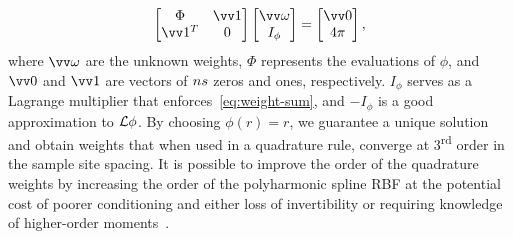 \begin{equation}\label{eq:rbf-quadrature}
    \begin{bmatrix}
            \Phi & \arr{1} \\ \arr{1}^T & 0
    \end{bmatrix}\begin{bmatrix}
            \arr{\omega} \\ I_\phi
    \end{bmatrix} = \begin{bmatrix}
            \arr{0} \\ 4\pi
    \end{bmatrix},
\end{equation}
where $\arr{\omega}$ are the unknown weights, $\Phi$ represents the evaluations of $\phi$, and $\arr{0}$ and
$\arr{1}$ are vectors of $\sample\cardinality$ zeros and ones, respectively. $I_{\phi}$ serves as a Lagrange
multiplier that enforces~\eqref{eq:weight-sum}, and $-I_\phi$ is a good approximation to $\mathcal{L}\phi$. By choosing
$\phi(r) = r$, we guarantee a unique solution and obtain weights that when used in a quadrature rule, converge at 3\textsuperscript{rd} order in the sample site spacing. It is possible to improve the order of the quadrature weights by increasing the order
of the polyharmonic spline RBF at the potential cost of poorer conditioning and either loss of invertibility or requiring
knowledge of higher-order moments~\cite{Fuselier:2013coba}.

